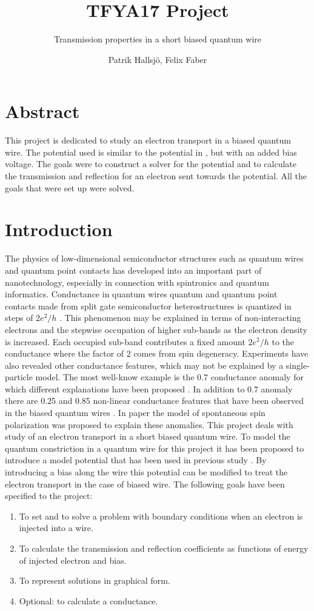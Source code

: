 \documentclass[a4paper]{article}
\subtitle{Transmission properties in a short biased quantum wire}
\title{TFYA17 Project}
\author{Patrik Hallsj\"o, Felix Faber}
\date{}
\begin{document}
\maketitle

\section*{Abstract}
This project is dedicated to study an electron transport in a biased quantum wire. The potential used is similar to the potential in \cite{5}, but with an added bias voltage. The goals were to construct a solver for the potential and to calculate the transmission and reflection for an electron sent towards the potential. All the goals that were set up were solved.

\newpage
\section{Introduction}
The physics of low-dimensional semiconductor structures such as quantum wires and quantum point contacts has developed into an important part of nanotechnology, especially in connection with spintronics and quantum informatics.
Conductance in quantum wires quantum and quantum point contacts  made from split gate semiconductor heterostructures is quantized in steps of $2e^2/h$ \cite{1}.
This phenomenon may be explained in terms of non-interacting electrons and the stepwise occupation of higher sub-bands as the electron density is increased.
Each occupied sub-band contributes a fixed amount $2e^2 /h$  to the conductance where the factor of 2 comes from spin degeneracy.
Experiments have also revealed other conductance features, which may not be explained by a single-particle model.
The most well-know example is the 0.7 conductance anomaly  for which different explanations have been proposed \cite{2}.  In addition to 0.7 anomaly there are  0.25 and 0.85 non-linear conductance features that have been observed in the biased quantum wires \cite{3}.
In paper \cite{4} the model of spontaneous spin polarization was proposed to explain these anomalies.
This project deals with study of an electron transport in a short biased quantum wire. To model the quantum constriction in a quantum wire for this project it has been proposed to introduce a model potential that has been used in previous study \cite{5}.
By introducing a bias along the wire this potential can be modified to treat the electron transport in the case of biased wire.
The following goals have been specified to the project:
\begin{enumerate}
\item To set and to solve a problem with boundary conditions when an electron is injected into a wire.
\item To calculate the transmission and reflection coefficients as functions of energy of injected electron and bias.
\item To represent solutions in graphical form.
\item Optional: to calculate a conductance.
\end{enumerate}
\end{document}
